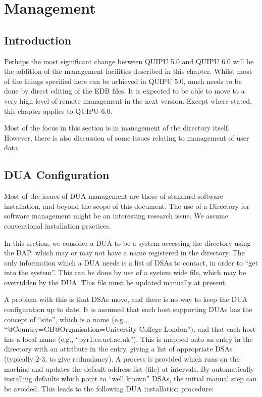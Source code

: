 
\chapter {Management}
\section {Introduction}

Perhaps the most significant change between QUIPU 5.0 and QUIPU 6.0 will be
the addition of the management facilities described in this chapter.  Whilst
most of the things specified here can be achieved in QUIPU 5.0, much needs to
be done by direct editing of the EDB files.  It is expected to be able to
move to a very high level of remote management in the next version.  Except
where stated, this chapter applies to QUIPU 6.0.

Most of the focus in this section is in management of the directory itself.
However, there is also discussion of some issues relating to management of
user data.


\section {DUA Configuration}

\label {dua-mgt}

Most of the issues of DUA management are those of standard software
installation, and beyond the scope of this document.  The use of a Directory
for software management might be an interesting research issue.   
We assume conventional installation practices.  

In this section, we consider a DUA to be a system accessing the directory
using the DAP, which may or may not have a name registered in the directory.
The only information which a DUA needs is a list of DSAs to contact, in
order to ``get into the system''.  This can be done by use of a system wide
file, which may be overridden by the DUA.  This file must be updated
manually at present.

A problem with this is that DSAs move, and there is no way to keep the DUA
configuration up to date.  It is assumed that each host supporting DUAs has
the concept of ``site'', which is a name (e.g.,
``@Country=GB@Organisation=University College London''), and that each host
has a local name (e.g., ``pyr1.cs.ucl.ac.uk'').  This is mapped onto an
entry in the directory with an attribute in the entry, giving a list of appropriate DSAs (typically 2-3, to
give redundancy).  A process is provided which runs on the machine and
updates the default address list (file) at intervals.  By automatically
installing defaults which point to ``well known'' DSAs, the initial manual
step can be avoided.  This leads to the following DUA installation procedure:

